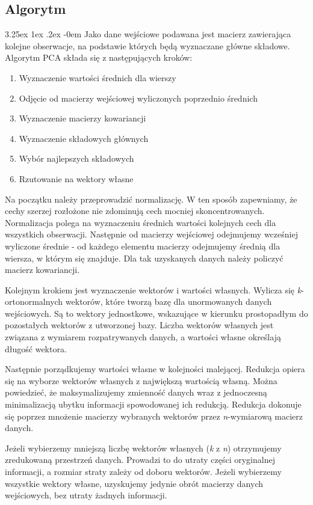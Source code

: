 \documentclass[11pt, a4paper]{article}
\makeatletter
\newcommand{\fbi}{\leavevmode{\parindent=1em\indent}}
\renewcommand\paragraph{\@startsection{paragraph}{5}{\z@}
  {3.25ex \@plus1ex \@minus.2ex}
  {-0em}
  {\normalfont\normalsize\bfseries}}
\makeatother
\begin{document}
\subsection{Algorytm}
\paragraph{}
Jako dane wejściowe podawana jest macierz zawierająca kolejne obserwacje, na podstawie których będą wyznaczane główne składowe. Algorytm PCA składa się z następujących kroków:
\begin{enumerate}[1.]
	\item Wyznaczenie wartości średnich dla wierszy 
	\item Odjęcie od macierzy wejściowej wyliczonych poprzednio średnich
	\item Wyznaczenie macierzy kowariancji
	\item Wyznaczenie składowych głównych
	\item Wybór najlepszych składowych
	\item Rzutowanie na wektory własne
\end{enumerate}

\fbi
Na początku należy przeprowadzić normalizację. W ten sposób zapewniamy, że cechy szerzej rozłożone nie zdominują cech mocniej skoncentrowanych. Normalizacja polega na wyznaczeniu średnich wartości kolejnych cech dla wszystkich obserwacji. Następnie od macierzy wejściowej odejmujemy wcześniej wyliczone średnie - od każdego elementu macierzy odejmujemy średnią dla wiersza, w którym się znajduje. Dla tak uzyskanych danych należy policzyć macierz kowariancji.

\fbi
Kolejnym krokiem jest wyznaczenie wektorów i wartości własnych. Wylicza się \textit{k}-ortonormalnych wektorów, które tworzą bazę dla unormowanych danych wejściowych. Są to wektory jednostkowe, wskazujące w kierunku prostopadłym do pozostałych wektorów z utworzonej bazy. Liczba wektorów własnych jest związana z wymiarem rozpatrywanych danych, a wartości własne określają długość wektora.

\fbi
Następnie porządkujemy wartości własne w kolejności malejącej. Redukcja opiera się na wyborze wektorów własnych z największą wartością własną. Można powiedzieć, że maksymalizujemy zmienność danych wraz z jednoczesną minimalizacją ubytku informacji spowodowanej ich redukcją. Redukcja dokonuje się poprzez mnożenie macierzy wybranych wektorów przez \textit{n}-wymiarową macierz danych.

\fbi
Jeżeli wybierzemy mniejszą liczbę wektorów własnych (\textit{k} z \textit{n}) otrzymujemy zredukowaną przestrzeń danych. Prowadzi to do utraty części oryginalnej informacji, a rozmiar straty zależy od doboru wektorów. Jeżeli wybierzemy wszystkie wektory własne, uzyskujemy jedynie obrót macierzy danych wejściowych, bez utraty żadnych informacji.
\end{document}
